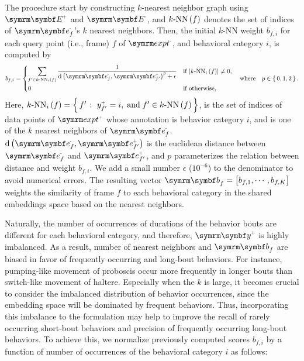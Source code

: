 The procedure start by constructing $k$-nearest neighbor graph using $\Ann{\V{E}}$ and $\Unann{\V{E}}$, and ${k\mathrm{\textnormal{-}NN}} \left( f \right)$ denotes the set of indices of $\Unann{\V{e}}_f$'s $k$ nearest neighbors. Then, the initial $k$-NN weight $b_{f,i}$ for each query point (i.e., frame) $f$ of $\exptUnann$, and behavioral category $i$, is computed by
\begin{equation}
	b_{f,i} = \begin{dcases}
		\sum_{f^\prime \in \NNi{k}{i}{f}}\frac{1}{\dist{\Unann{\V{e}}_f}{\Ann{\V{e}}_{f^\prime}}^p + \epsilon} & \textnormal{if } \card{\NNi{k}{i}{f}} \neq 0, \\
		0                                                                                                      & \textnormal{if otherwise},
	\end{dcases} \qbwhere p \in \set{0,1,2}.
\end{equation}
Here, $\NNi{k}{i}{f}=\Set{f^\prime}{\Ann{y}_{f^\prime}=i, \dband f^\prime \in \NN{k}{f}}$, is the set of indices of data points of $\exptAnn$ whose annotation is behavior category $i$, and is one of the $k$ nearest neighbors of $\Unann{\V{e}}_f$.
$\dist{\Unann{\V{e}}_f}{\Ann{\V{e}}_{f^\prime}}$ is the euclidean distance between $\Unann{\V{e}}_f$ and $\Ann{\V{e}}_{f^\prime}$, and $p$ parameterizes the relation between distance and weight $b_{f,i}$.
We add a small number $\epsilon$ ($10^{{-}6}$) to the denominator to avoid numerical errors.
The resulting vector $\V{b}_f = \qmatrix{b_{f,1}, \cdots, b_{f,K}}$ weights the similarity of frame $f$ to each behavioral category in the shared embeddings space based on the nearest neighbors.

Naturally, the number of occurrences of durations of the behavior bouts are different for each behavioral category, and therefore, $\Ann{\V{y}}$ is highly imbalanced.
As a result, number of nearest neighbors and $\V{b}_f$ are biased in favor of frequently occurring and long-bout behaviors.
For instance, pumping-like movement of proboscis occur more frequently in longer bouts than switch-like movement of haltere.
Especially when the $k$ is large, it becomes crucial to consider the imbalanced distribution of behavior occurrences, since the embedding space will be dominated by frequent behaviors.
Thus, incorporating this imbalance to the formulation may help to improve the recall of rarely occurring short-bout behaviors and precision of frequently occurring long-bout behaviors.
To achieve this, we normalize previously computed scores $b_{f,i}$ by a function of number of occurrences of the behavioral category $i$ as follows:

